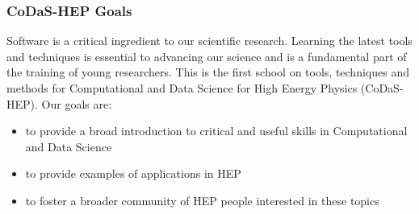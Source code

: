 \begin{frame}
\frametitle{CoDaS-HEP Goals}

Software is a critical ingredient to our scientific research. Learning the latest tools and techniques is essential to advancing our science and is a fundamental part of the training of young researchers.
\vskip 0.10in
This is the first school on tools, techniques and methods for Computational and Data Science for High Energy Physics (CoDaS-HEP). Our goals are:
\vskip 0.10in
\begin{itemize}
\item to provide a broad introduction to critical and useful skills in Computational and Data Science
\item to provide examples of applications in HEP
\item to foster a broader community of HEP people interested in these topics
\end{itemize}
\end{frame}


